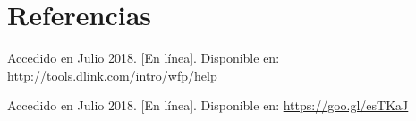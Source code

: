 \documentclass[letterpaper,oneside,12pt]{book}
\begin{document}
\section{Referencias}
\begin{enumerate}[{[1]}]
\item{Accedido en Julio 2018. [En línea]. Disponible en: \url{http://tools.dlink.com/intro/wfp/help} \label{fig:prop}}
\item{Accedido en Julio 2018. [En línea]. Disponible en: \url{https://goo.gl/esTKaJ} \label{fig:paginaHP}}
\end{enumerate}


\end{document}
